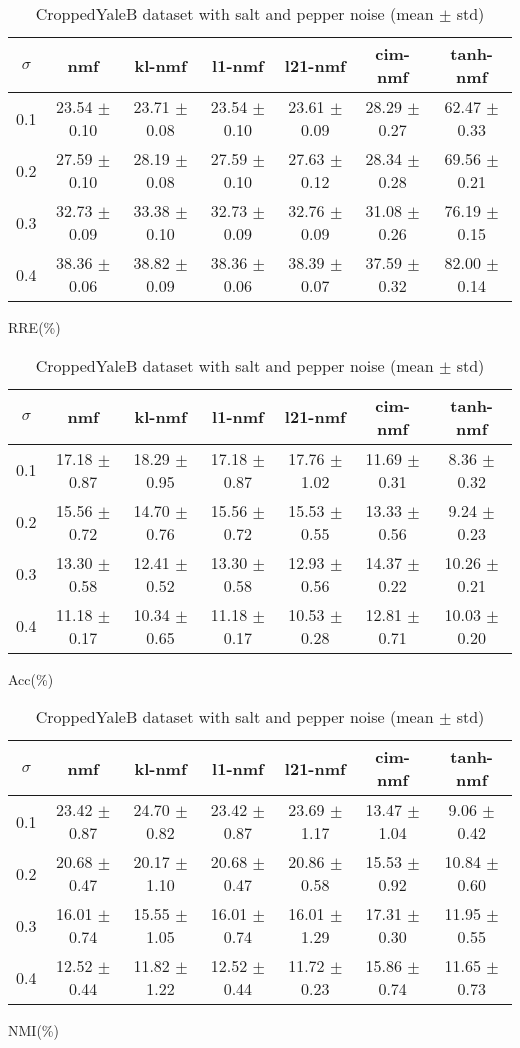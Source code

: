 \documentclass{article} %
\begin{document}
\begin{table}
\begin{subtable}{\linewidth}
\begin{tabular}{c|cccccc}$\sigma$ & nmf & kl-nmf & l1-nmf & l21-nmf & cim-nmf & tanh-nmf \\\hline
0.1 & 23.54 $\pm$ 0.10 & 23.71 $\pm$ 0.08 & 23.54 $\pm$ 0.10 & 23.61 $\pm$ 0.09 & 28.29 $\pm$ 0.27 & 62.47 $\pm$ 0.33 \\
0.2 & 27.59 $\pm$ 0.10 & 28.19 $\pm$ 0.08 & 27.59 $\pm$ 0.10 & 27.63 $\pm$ 0.12 & 28.34 $\pm$ 0.28 & 69.56 $\pm$ 0.21 \\
0.3 & 32.73 $\pm$ 0.09 & 33.38 $\pm$ 0.10 & 32.73 $\pm$ 0.09 & 32.76 $\pm$ 0.09 & 31.08 $\pm$ 0.26 & 76.19 $\pm$ 0.15 \\
0.4 & 38.36 $\pm$ 0.06 & 38.82 $\pm$ 0.09 & 38.36 $\pm$ 0.06 & 38.39 $\pm$ 0.07 & 37.59 $\pm$ 0.32 & 82.00 $\pm$ 0.14 \\
\end{tabular}\caption{RRE(\%)}\end{subtable}
\begin{subtable}{\linewidth}
\begin{tabular}{c|cccccc}$\sigma$ & nmf & kl-nmf & l1-nmf & l21-nmf & cim-nmf & tanh-nmf \\\hline
0.1 & 17.18 $\pm$ 0.87 & 18.29 $\pm$ 0.95 & 17.18 $\pm$ 0.87 & 17.76 $\pm$ 1.02 & 11.69 $\pm$ 0.31 & 8.36 $\pm$ 0.32 \\
0.2 & 15.56 $\pm$ 0.72 & 14.70 $\pm$ 0.76 & 15.56 $\pm$ 0.72 & 15.53 $\pm$ 0.55 & 13.33 $\pm$ 0.56 & 9.24 $\pm$ 0.23 \\
0.3 & 13.30 $\pm$ 0.58 & 12.41 $\pm$ 0.52 & 13.30 $\pm$ 0.58 & 12.93 $\pm$ 0.56 & 14.37 $\pm$ 0.22 & 10.26 $\pm$ 0.21 \\
0.4 & 11.18 $\pm$ 0.17 & 10.34 $\pm$ 0.65 & 11.18 $\pm$ 0.17 & 10.53 $\pm$ 0.28 & 12.81 $\pm$ 0.71 & 10.03 $\pm$ 0.20 \\
\end{tabular}\caption{Acc(\%)}\end{subtable}
\begin{subtable}{\linewidth}
\begin{tabular}{c|cccccc}$\sigma$ & nmf & kl-nmf & l1-nmf & l21-nmf & cim-nmf & tanh-nmf \\\hline
0.1 & 23.42 $\pm$ 0.87 & 24.70 $\pm$ 0.82 & 23.42 $\pm$ 0.87 & 23.69 $\pm$ 1.17 & 13.47 $\pm$ 1.04 & 9.06 $\pm$ 0.42 \\
0.2 & 20.68 $\pm$ 0.47 & 20.17 $\pm$ 1.10 & 20.68 $\pm$ 0.47 & 20.86 $\pm$ 0.58 & 15.53 $\pm$ 0.92 & 10.84 $\pm$ 0.60 \\
0.3 & 16.01 $\pm$ 0.74 & 15.55 $\pm$ 1.05 & 16.01 $\pm$ 0.74 & 16.01 $\pm$ 1.29 & 17.31 $\pm$ 0.30 & 11.95 $\pm$ 0.55 \\
0.4 & 12.52 $\pm$ 0.44 & 11.82 $\pm$ 1.22 & 12.52 $\pm$ 0.44 & 11.72 $\pm$ 0.23 & 15.86 $\pm$ 0.74 & 11.65 $\pm$ 0.73 \\
\end{tabular}\caption{NMI(\%)}\end{subtable}
\caption{CroppedYaleB dataset with salt and pepper noise (mean $\pm$ std)}
\end{table}
\end{document}
